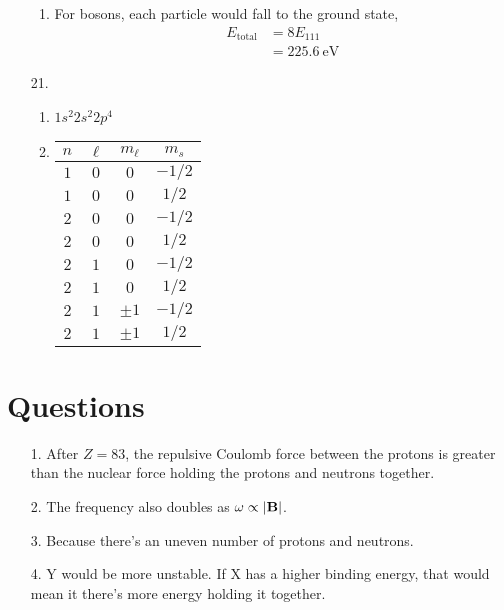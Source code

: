 \documentclass{homework}
\begin{document}
\begin{enumerate}
\begin{enumerate}
			\item For bosons, each particle would fall to the ground state, \begin{align*}
				E_\mathrm{total} & = 8 E_{111} \\
					& = \SI{225.6}{\eV}
			\end{align*}
		\end{enumerate}
		\item[21.] \begin{enumerate}
			\item $1s^2 2s^2 2p^4$
			\item \begin{tabular}[t]{cccc}
				\toprule
				$n$ & $\ell$ & $m_\ell$ & $m_s$ \\
				\midrule
				$1$ & $0$ & $0$ & $-1/2$ \\
				$1$ & $0$ & $0$ & $1/2$ \\
				\midrule
				$2$ & $0$ & $0$ & $-1/2$ \\
				$2$ & $0$ & $0$ & $1/2$ \\
				$2$ & $1$ & $0$ & $-1/2$ \\
				$2$ & $1$ & $0$ & $1/2$ \\
				$2$ & $1$ & $\pm1$ & $-1/2$ \\
				$2$ & $1$ & $\pm1$ & $1/2$ \\
				\bottomrule
			\end{tabular}
		\end{enumerate}
	\end{enumerate}

	\section*{Questions}
	\begin{enumerate}
		\item[1.] After $Z=83$, the repulsive Coulomb force between the protons is greater than the nuclear force holding the protons and neutrons together.
		\item[2.] The frequency also doubles as $\omega \propto \abs{\boldsymbol{\mathrm{B}}}$.
		\item[3.] Because there's an uneven number of protons and neutrons.
		\item[4.] Y would be more unstable. If X has a higher binding energy, that would mean it there's more energy holding it together.
	\end{enumerate}
\end{document}
